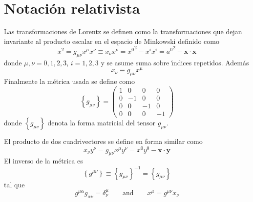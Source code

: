 \section{Notaci\'on relativista}
\label{sec:srn}
\begin{frame}
Las transformaciones de Lorentz se definen como la transformaciones que dejan invariante al producto escalar en el espacio de Minkowski definido como
\begin{equation}
  \label{eq:146}
  x^2=g_{\mu\nu}x^\mu x^\nu\equiv x_\nu x^\nu={x^0}^2-x^i x^i={a^0}^2-\mathbf{x}\cdot\mathbf{x}
\end{equation}
donde $\mu,\nu=0,1,2,3$, $i=1,2,3$ y se asume suma sobre \'\i ndices repetidos. Adem\'as
\begin{equation}
\label{eq:149}
  x_\nu\equiv g_{\mu\nu}x^\mu
\end{equation}
 Finalmente la m\'etrica usada se define como
\begin{equation}
  \label{eq:gmunu}
  \left\{ g_{\mu\nu} \right\}=
  \begin{pmatrix}
    1&0&0&0\\
    0&-1&0&0\\
    0&0&-1&0\\
    0&0&0&-1
  \end{pmatrix}
\end{equation}
donde $\left\{ g_{\mu\nu} \right\}$ denota la forma matricial del tensor $g_{\mu\nu}$.  



El producto de dos cuadrivectores se define en forma similar como
\begin{equation}
\label{eq:157}
  x_\nu y^\nu=g_{\mu\nu}x^\mu y^\nu=x^0y^0-\mathbf{x}\cdot\mathbf{y}
\end{equation}
El inverso de la m\'etrica es
\begin{equation}
  \left\{ g^{\mu\nu} \right\}\equiv\left\{ g_{\mu\nu} \right\}^{-1}=\left\{ g_{\mu\nu} \right\}
\end{equation}
tal que
\begin{equation}
  g^{\mu\alpha}g_{\alpha\nu}=\delta^\mu_\nu\qquad\text{and}\qquad x^\mu=g^{\mu\nu}x_\nu
\end{equation}


\end{frame}
